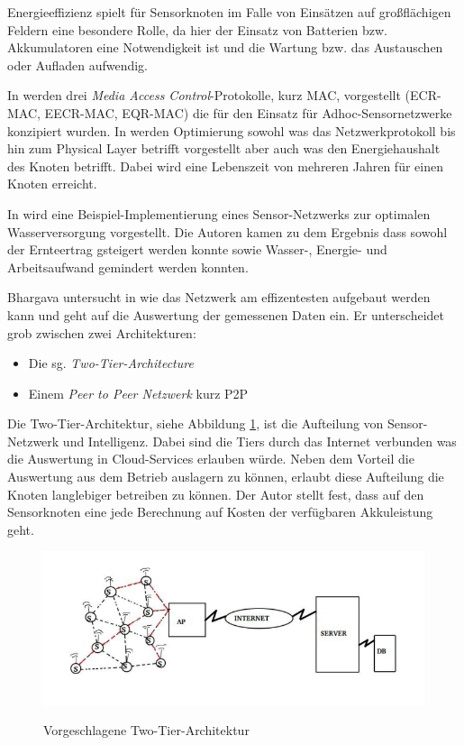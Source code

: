 Energieeffizienz spielt für Sensorknoten im Falle von Einsätzen auf großflächigen Feldern eine besondere Rolle, da hier der Einsatz von Batterien bzw. Akkumulatoren eine Notwendigkeit ist und die Wartung bzw. das Austauschen oder Aufladen aufwendig. 

In \cite{conf:Zia2013} werden drei \textit{Media Access Control}-Protokolle, kurz MAC, vorgestellt (ECR-MAC, EECR-MAC, EQR-MAC) die für den Einsatz für Adhoc-Sensornetzwerke konzipiert wurden. In \cite{jour:Jelicic2013} werden Optimierung sowohl was das Netzwerkprotokoll bis hin zum Physical Layer betrifft vorgestellt aber auch was den Energiehaushalt des Knoten betrifft. Dabei wird eine Lebenszeit von mehreren Jahren für einen Knoten erreicht.

In \cite{jour:Nandurkar2014} wird eine Beispiel-Implementierung eines Sensor-Netzwerks zur optimalen Wasserversorgung vorgestellt. Die Autoren kamen zu dem Ergebnis dass sowohl der Ernteertrag gsteigert werden konnte sowie Wasser-, Energie- und Arbeitsaufwand gemindert werden konnten.

Bhargava untersucht in \cite{jour:Bhargava2014} wie das Netzwerk am effizentesten aufgebaut werden kann und geht auf die Auswertung der gemessenen Daten ein. Er unterscheidet grob zwischen zwei Architekturen:
\begin{itemize}
	\item Die sg. \textit{Two-Tier-Architecture}
	\item Einem \textit{Peer to Peer Netzwerk} kurz P2P
\end{itemize}

Die Two-Tier-Architektur, siehe Abbildung \ref{fig:two_tier_architecture}, ist die Aufteilung von Sensor-Netzwerk und Intelligenz. Dabei sind die Tiers durch das Internet verbunden was die Auswertung in Cloud-Services erlauben würde. Neben dem Vorteil die Auswertung aus dem Betrieb auslagern zu können, erlaubt diese Aufteilung die Knoten langlebiger betreiben zu können. Der Autor stellt fest, dass auf den Sensorknoten eine jede Berechnung auf Kosten der verfügbaren Akkuleistung geht.\cite{jour:Bhargava2014}

\begin{figure}[h]
 \includegraphics[scale=0.65,natwidth=\textwidth]{figures/sensors/two_tier_architecture.png}
 \centering
 \label{fig:two_tier_architecture}
 \caption{Vorgeschlagene Two-Tier-Architektur \cite{jour:Bhargava2014}}
\end{figure}

